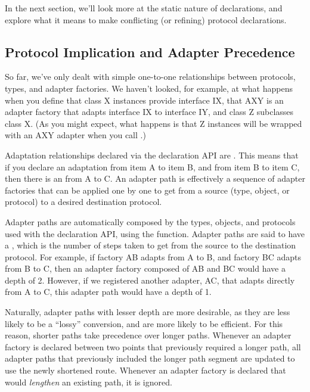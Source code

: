 \begin{verbatim%
}
\begin{verbatim%
}
\begin{verbatim%
}
\begin{verbatim%
}
\begin{verbatim%
}
\begin{verbatim%
}
In the next section, we'll look more at the static nature of declarations,
and explore what it means to make conflicting (or refining) protocol
declarations.













\newpage
\subsection{Protocol Implication and Adapter Precedence \label{proto-implication}}

So far, we've only dealt with simple one-to-one relationships between
protocols, types, and adapter factories.  We haven't looked, for example, at
what happens when you define that class X instances provide interface IX,
that AXY is an adapter factory that adapts interface IX to interface IY, and
class Z subclasses class X.  (As you might expect, what happens is that Z
instances will be wrapped with an AXY adapter when you call
.)

Adaptation relationships declared via the declaration API are
.  This means that if you declare an adaptation from item A
to item B, and from item B to item C, then there is an 
from A to C.  An adapter path is effectively a sequence of adapter factories
that can be applied one by one to get from a source (type, object, or protocol)
to a desired destination protocol.

Adapter paths are automatically composed by the types, objects, and protocols
used with the declaration API, using the  function.
Adapter paths are said to have a , which is the number of steps
taken to get from the source to the destination protocol.  For example, if
factory AB adapts from A to B, and factory BC adapts from B to C, then an
adapter factory composed of AB and BC would have a depth of 2.  However, if we
registered another adapter, AC, that adapts directly from A to C, this adapter
path would have a depth of 1.

Naturally, adapter paths with lesser depth are more desirable, as they are less
likely to be a ``lossy'' conversion, and are more likely to be efficient.  For
this reason, shorter paths take precedence over longer paths.  Whenever an
adapter factory is declared between two points that previously required a
longer path, all adapter paths that previously included the longer path segment
are updated to use the newly shortened route.  Whenever an adapter factory is
declared that would \emph{lengthen} an existing path, it is ignored.


\end{verbatim%
}
\end{verbatim%
}
\end{verbatim%
}
\end{verbatim%
}
\end{verbatim%
}
\end{verbatim%
}
